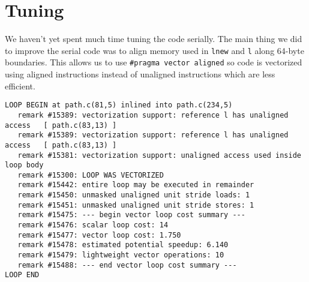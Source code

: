 \section{Tuning}\label{sec:tuning}
We haven't yet spent much time tuning the code serially. The main thing we did
to improve the serial code was to align memory used in \texttt{lnew} and
\texttt{l} along 64-byte boundaries. This allows us to use \texttt{\#pragma
vector aligned} so code is vectorized using aligned instructions instead of
unaligned instructions which are less efficient.

{
\scriptsize
\begin{verbatim}
LOOP BEGIN at path.c(81,5) inlined into path.c(234,5)
   remark #15389: vectorization support: reference l has unaligned access   [ path.c(83,13) ]
   remark #15389: vectorization support: reference l has unaligned access   [ path.c(83,13) ]
   remark #15381: vectorization support: unaligned access used inside loop body
   remark #15300: LOOP WAS VECTORIZED
   remark #15442: entire loop may be executed in remainder
   remark #15450: unmasked unaligned unit stride loads: 1
   remark #15451: unmasked unaligned unit stride stores: 1
   remark #15475: --- begin vector loop cost summary ---
   remark #15476: scalar loop cost: 14
   remark #15477: vector loop cost: 1.750
   remark #15478: estimated potential speedup: 6.140
   remark #15479: lightweight vector operations: 10
   remark #15488: --- end vector loop cost summary ---
LOOP END
\end{verbatim}
}
